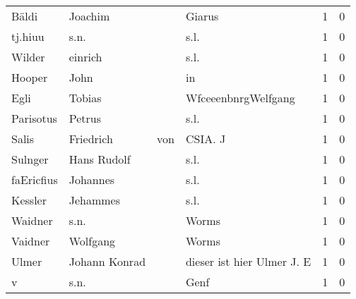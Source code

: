 \begin{tabular}{llllrr}
                    Bäldi &                            Joachim &             &                                      Giarus &          1 &         0 \\
                  tj.hiuu &                               s.n. &             &                                        s.l. &          1 &         0 \\
                   Wilder &                            einrich &             &                                        s.l. &          1 &         0 \\
                   Hooper &                               John &             &                                          in &          1 &         0 \\
                     Egli &                             Tobias &             &                         WfceeenbnrgWelfgang &          1 &         0 \\
                Parisotus &                             Petrus &             &                                        s.l. &          1 &         0 \\
                    Salis &                          Friedrich &         von &                                     CSIA. J &          1 &         0 \\
                  Sulnger &                        Hans Rudolf &             &                                        s.l. &          1 &         0 \\
               faEricfius &                           Johannes &             &                                        s.l. &          1 &         0 \\
                  Kessler &                           Jehammes &             &                                        s.l. &          1 &         0 \\
                  Waidner &                               s.n. &             &                                       Worms &          1 &         0 \\
                  Vaidner &                           Wolfgang &             &                                       Worms &          1 &         0 \\
                    Ulmer &                      Johann Konrad &             &                  dieser ist hier Ulmer J. E &          1 &         0 \\
                        v &                               s.n. &             &                                        Genf &          1 &         0 \\

\end{tabular}
